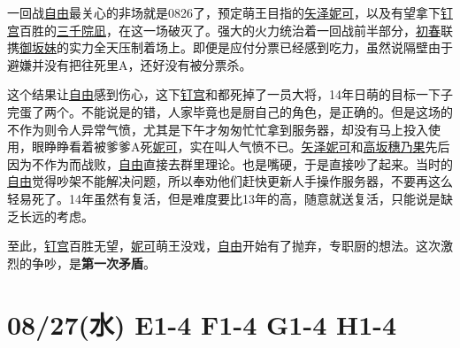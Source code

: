 
一回战\uline{自由}最关心的非场就是0826了，预定萌王目指的\uline{矢泽妮可}，以及有望拿下\uline{钉宫}百胜的\uline{三千院凪}，在这一场破灭了。强大的火力统治着一回战前半部分，\uline{初春}联携\uline{御坂妹}的实力全天压制着场上。即便是应付分票已经感到吃力，虽然说隔壁由于避嫌并没有把往死里A，还好没有被分票杀。

这个结果让\uline{自由}感到伤心，这下\uline{钉宫}和都死掉了一员大将，14年日萌的目标一下子完蛋了两个。不能说是的错，人家毕竟也是厨自己的角色，是正确的。但是这场的不作为则令人异常气愤，尤其是下午才匆匆忙忙拿到服务器，却没有马上投入使用，眼睁睁看着被爹爹A死\uline{妮可}，实在叫人气愤不已。\uline{矢泽妮可}和\uline{高坂穗乃果}先后因为不作为而战败，\uline{自由}直接去群里理论。也是嘴硬，于是直接吵了起来。当时的\uline{自由}觉得吵架不能解决问题，所以奉劝他们赶快更新人手操作服务器，不要再这么轻易死了。14年虽然有复活，但是难度要比13年的高，随意就送复活，只能说是缺乏长远的考虑。

至此，\uline{钉宫}百胜无望，\uline{妮可}萌王没戏，\uline{自由}开始有了抛弃，专职厨的想法。这次激烈的争吵，是\textbf{第一次矛盾}。

\section{08/27(水) E1-4 F1-4 G1-4 H1-4}

